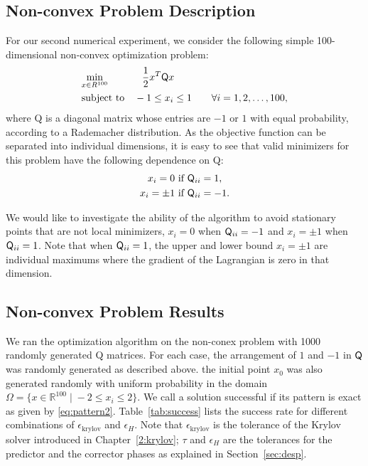 \subsection{Non-convex Problem Description}
For our second numerical experiment, we consider the following simple 100-dimensional non-convex optimization problem:
\begin{equation*}
\begin{aligned}
&\underset{x \in R^{100}} {\text{min}}  
& &\phantom{-} \frac{1}{2}x^T \mathsf{Q} x \\
  & {\text{subject to}}
& &-1 \leq x_i \leq 1 \qquad \forall i = 1,2,\ldots,100, \\
\end{aligned}
\end{equation*}
where Q is a diagonal matrix whose entries are $-1$ or $1$ with equal probability, 
 \ie according to a Rademacher distribution. 
 As the objective function can be separated into 
individual dimensions, it is easy to see that 
valid minimizers for this problem have the following dependence on Q:
\begin{equation}\label{eq:pattern2}
  \begin{gathered}
  x_i=0  \text{~if~}  \mathsf{Q}_{ii} = 1,  \\
  x_i = \pm 1  \text{~if~}  \mathsf{Q}_{ii} = -1.
  \end{gathered}
\end{equation}

We would like to investigate
the ability of the algorithm to avoid stationary points that are not local minimizers, 
\eg $x_i = 0$ 
when $\mathsf{Q}_{ii} = -1$ and $x_i = \pm 1$ when $\mathsf{Q}_{ii} = 1$.
Note that when $\mathsf{Q}_{ii} = 1$, the upper and lower bound $x_i = \pm 1$ are 
individual maximums where the gradient of the Lagrangian is zero in that dimension. 

\subsection{Non-convex Problem Results}
We ran the optimization algorithm on the non-conex problem with 1000 randomly generated Q matrices.
For each case, 
the arrangement of $1$ and $-1$ in $\mathsf{Q}$ was randomly generated as described above. 
 the initial point $x_0$ was also generated randomly with uniform probability in the domain
  $\Omega = \{ x \in \mathbb{R}^{100} \; | \; -2 \leq x_i \leq 2 \}$.  We call a solution successful if 
  its pattern is exact as given by \eqref{eq:pattern2}.  Table~\ref{tab:success} lists the success rate for different 
  combinations of $\epsilon_{\text{krylov}}$ and $\epsilon_H$. 
Note that $\epsilon_{\text{krylov}}$ is the tolerance of the Krylov solver introduced in Chapter~\ref{2:krylov}; 
$\tau$ and $\epsilon_H$ are the tolerances for the predictor and the corrector phases as explained in Section~\ref{sec:desp}. 
 
